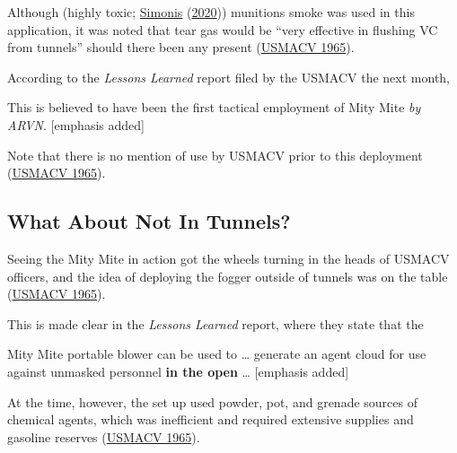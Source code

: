 \documentclass[
  11pt,
]{krantz}
\renewenvironment{quote}{\begin{VF}}{\end{VF}}
\begin{document}
Although (highly toxic; \protect\hyperlink{ref-Simonis2020}{Simonis} (\protect\hyperlink{ref-Simonis2020}{2020})) munitions smoke was used in this application, it was noted that tear gas would be ``very effective in flushing VC from tunnels'' should there been any present (\protect\hyperlink{ref-USMACV1965}{USMACV 1965}).

According to the \emph{Lessons Learned} report filed by the USMACV the next month,

\begin{quote}
This is believed to have been the first tactical employment of Mity Mite \emph{by ARVN}. {[}emphasis added{]}

\end{quote}

Note that there is no mention of use by USMACV prior to this deployment (\protect\hyperlink{ref-USMACV1965}{USMACV 1965}).

\hypertarget{what-about-not-in-tunnels}{%
\subsection{What About Not In Tunnels?}\label{what-about-not-in-tunnels}}

Seeing the Mity Mite in action got the wheels turning in the heads of USMACV officers, and the idea of deploying the fogger outside of tunnels was on the table (\protect\hyperlink{ref-USMACV1965}{USMACV 1965}).

This is made clear in the \emph{Lessons Learned} report, where they state that the

\begin{quote}
Mity Mite portable blower can be used to \ldots{} generate an agent cloud for use against unmasked personnel \textbf{in the open} \ldots{} {[}emphasis added{]}

\end{quote}

At the time, however, the set up used powder, pot, and grenade sources of chemical agents, which was inefficient and required extensive supplies and gasoline reserves (\protect\hyperlink{ref-USMACV1965}{USMACV 1965}).
\end{document}
